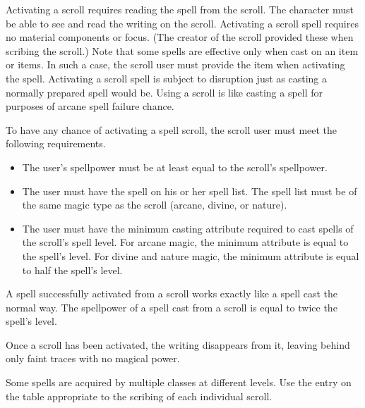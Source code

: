         Activating a scroll requires reading the spell from the scroll.
        The character must be able to see and read the writing on the scroll.
        Activating a scroll spell requires no material components or focus.
        (The creator of the scroll provided these when scribing the scroll.) Note that some spells are effective only when cast on an item or items.
        In such a case, the scroll user must provide the item when activating the spell.
        Activating a scroll spell is subject to disruption just as casting a normally prepared spell would be.
        Using a scroll is like casting a spell for purposes of arcane spell failure chance.

        To have any chance of activating a spell scroll, the scroll user must meet the following requirements.
        \begin{itemize}
            \item The user's spellpower must be at least equal to the scroll's spellpower.
            \item The user must have the spell on his or her spell list.
                The spell list must be of the same magic type as the scroll (arcane, divine, or nature).
            \item The user must have the minimum casting attribute required to cast spells of the scroll's spell level.
                For arcane magic, the minimum attribute is equal to the spell's level.
                For divine and nature magic, the minimum attribute is equal to half the spell's level.
        \end{itemize}

         A spell successfully activated from a scroll works exactly like a spell cast the normal way.
        The spellpower of a spell cast from a scroll is equal to twice the spell's level.

        Once a scroll has been activated, the writing disappears from it, leaving behind only faint traces with no magical power.

         Some spells are acquired by multiple classes at different levels.
        Use the entry on the table appropriate to the scribing of each individual scroll.

